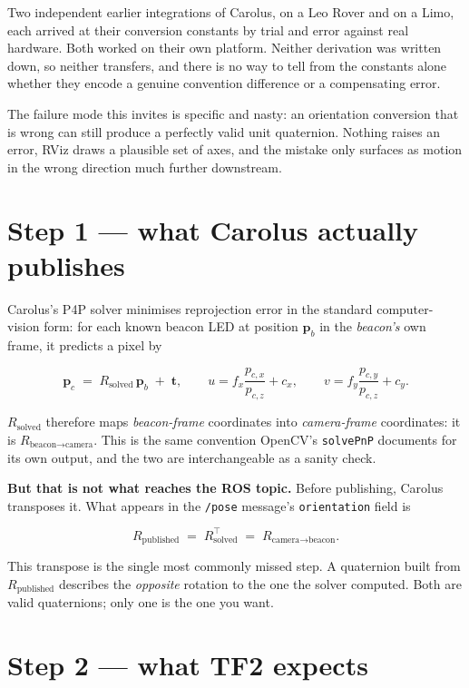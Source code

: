 \documentclass[11pt]{report}
\newenvironment{warningbox}%
  {\begin{lrbox}{\warnbox}\begin{minipage}{0.90\textwidth}}%
  {\end{minipage}\end{lrbox}%
   \begin{center}\fcolorbox{black}{codebg}{\usebox{\warnbox}}\end{center}}
\begin{document}
Two independent earlier integrations of Carolus, on a Leo Rover and on a
Limo, each arrived at their conversion constants by trial and error against
real hardware. Both worked on their own platform. Neither derivation was
written down, so neither transfers, and there is no way to tell from the
constants alone whether they encode a genuine convention difference or a
compensating error.

The failure mode this invites is specific and nasty: an orientation
conversion that is wrong can still produce a perfectly valid unit quaternion.
Nothing raises an error, RViz draws a plausible set of axes, and the mistake
only surfaces as motion in the wrong direction much further downstream.

\section{Step 1 --- what Carolus actually publishes}

Carolus's P4P solver minimises reprojection error in the standard
computer-vision form: for each known beacon LED at position $\mathbf{p}_b$ in
the \emph{beacon's} own frame, it predicts a pixel by

\[
\mathbf{p}_c \;=\; R_{\text{solved}}\,\mathbf{p}_b \;+\; \mathbf{t},
\qquad
u = f_x\frac{p_{c,x}}{p_{c,z}} + c_x,
\qquad
v = f_y\frac{p_{c,y}}{p_{c,z}} + c_y .
\]

$R_{\text{solved}}$ therefore maps \emph{beacon-frame} coordinates into
\emph{camera-frame} coordinates: it is $R_{\text{beacon}\to\text{camera}}$.
This is the same convention OpenCV's \texttt{solvePnP} documents for its own
output, and the two are interchangeable as a sanity check.

\textbf{But that is not what reaches the ROS topic.} Before publishing,
Carolus transposes it. What appears in the \texttt{/pose} message's
\texttt{orientation} field is

\[
R_{\text{published}} \;=\; R_{\text{solved}}^{\top} \;=\; R_{\text{camera}\to\text{beacon}} .
\]

\begin{warningbox}
This transpose is the single most commonly missed step. A quaternion built
from $R_{\text{published}}$ describes the \emph{opposite} rotation to the one
the solver computed. Both are valid quaternions; only one is the one you
want.
\end{warningbox}

\section{Step 2 --- what TF2 expects}
\end{document}
